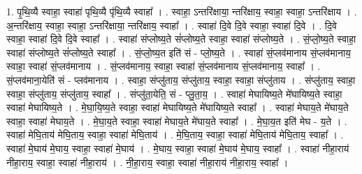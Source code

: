 \documentclass[17pt]{extarticle}
\begin{document}
1. पृ॒थि॒व्यै स्वाहा॒ स्वाहा॑ पृथि॒व्यै पृ॑थि॒व्यै स्वाहा᳚ । . स्वाहा॒ ऽन्तरि॑क्षाया॒ न्तरि॑क्षाय॒ स्वाहा॒ स्वाहा॒ ऽन्तरि॑क्षाय । . अ॒न्तरि॑क्षाय॒ स्वाहा॒ स्वाहा॒ ऽन्तरि॑क्षाया॒ न्तरि॑क्षाय॒ स्वाहा᳚ । . स्वाहा॑ दि॒वे दि॒वे स्वाहा॒ स्वाहा॑ दि॒वे । . दि॒वे स्वाहा॒ स्वाहा॑ दि॒वे दि॒वे स्वाहा᳚ । . स्वाहा॑ संप्लोष्य॒ते सं॑प्लोष्य॒ते स्वाहा॒ स्वाहा॑ संप्लोष्य॒ते । . सं॒प्लो॒ष्य॒ते स्वाहा॒ स्वाहा॑ संप्लोष्य॒ते सं॑प्लोष्य॒ते स्वाहा᳚ । . सं॒प्लो॒ष्य॒त इति॑ सं - प्लो॒ष्य॒ते । . स्वाहा॑ सं॒प्लव॑मानाय सं॒प्लव॑मानाय॒ स्वाहा॒ स्वाहा॑ सं॒प्लव॑मानाय । . सं॒प्लव॑मानाय॒ स्वाहा॒ स्वाहा॑ सं॒प्लव॑मानाय सं॒प्लव॑मानाय॒ स्वाहा᳚ । . सं॒प्लव॑माना॒येति॑ सं - प्लव॑मानाय । . स्वाहा॒ संप्लु॑ताय॒ संप्लु॑ताय॒ स्वाहा॒ स्वाहा॒ संप्लु॑ताय । . संप्लु॑ताय॒ स्वाहा॒ स्वाहा॒ संप्लु॑ताय॒ संप्लु॑ताय॒ स्वाहा᳚ । . संप्लु॑ता॒येति॒ सं - प्लु॒ता॒य॒ । . स्वाहा॑ मेघायिष्य॒ते मे॑घायिष्य॒ते स्वाहा॒ स्वाहा॑ मेघायिष्य॒ते । . मे॒घा॒यि॒ष्य॒ते स्वाहा॒ स्वाहा॑ मेघायिष्य॒ते मे॑घायिष्य॒ते स्वाहा᳚ । . स्वाहा॑ मेघाय॒ते मे॑घाय॒ते स्वाहा॒ स्वाहा॑ मेघाय॒ते । . मे॒घा॒य॒ते स्वाहा॒ स्वाहा॑ मेघाय॒ते मे॑घाय॒ते स्वाहा᳚ । . मे॒घा॒य॒त इति॑ मेघ - य॒ते । . स्वाहा॑ मेघि॒ताय॑ मेघि॒ताय॒ स्वाहा॒ स्वाहा॑ मेघि॒ताय॑ । . मे॒घि॒ताय॒ स्वाहा॒ स्वाहा॑ मेघि॒ताय॑ मेघि॒ताय॒ स्वाहा᳚ । . स्वाहा॑ मे॒घाय॑ मे॒घाय॒ स्वाहा॒ स्वाहा॑ मे॒घाय॑ । . मे॒घाय॒ स्वाहा॒ स्वाहा॑ मे॒घाय॑ मे॒घाय॒ स्वाहा᳚ । . स्वाहा॑ नीहा॒राय॑ नीहा॒राय॒ स्वाहा॒ स्वाहा॑ नीहा॒राय॑ । . नी॒हा॒राय॒ स्वाहा॒ स्वाहा॑ नीहा॒राय॑ नीहा॒राय॒ स्वाहा᳚ । \newline
\end{document}
